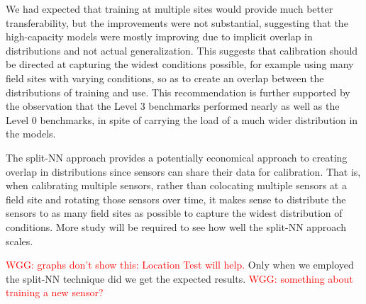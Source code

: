\documentclass[journal abbreviation, manuscript]{copernicus}
\newcommand\todo[1]{\textcolor{red}{#1}}
\begin{document}
We had expected that training at multiple sites would provide much better transferability, but the improvements were not substantial, suggesting that the high-capacity models were mostly improving due to implicit overlap in distributions and not actual generalization.  This suggests that calibration should be directed at capturing the widest conditions possible, for example using many field sites with varying conditions, so as to create an overlap between the distributions of training and use.  This recommendation is further supported by the observation that the Level 3 benchmarks performed nearly as well as the Level 0 benchmarks, in spite of carrying the load of a much wider distribution in the models.

The split-NN approach provides a potentially economical approach to creating overlap in distributions since sensors can share their data for calibration.  That is, when calibrating multiple sensors, rather than colocating multiple sensors at a field site and rotating those sensors over time, it makes sense to distribute the sensors to as many field sites as possible to capture the widest distribution of conditions.  More study will be required to see how well the split-NN approach scales.

\todo{WGG: graphs don't show this: Location Test will help.} Only when we employed the split-NN technique did we get the expected results.  
\todo{WGG: something about training a new sensor?}

% 
\end{document}
